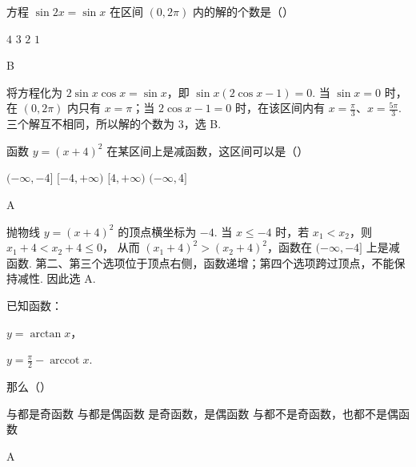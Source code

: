\documentclass[UTF8,a4paper,oneside,11pt]{ctexbook}
\begin{document}
\begin{problem}
方程 \(\sin 2x = \sin x\) 在区间 \((0,2\pi)\) 内的解的个数是（\quad）

\choices
    {\(4\)}
    {\(3\)}
    {\(2\)}
    {\(1\)}
\end{problem}

\begin{answer}
B
\end{answer}

\begin{solution}
将方程化为
\(2\sin x\cos x=\sin x\)，即 \(\sin x(2\cos x-1)=0\).
当 \(\sin x=0\) 时，在 \((0,2\pi)\) 内只有 \(x=\pi\)；当 \(2\cos x-1=0\) 时，在该区间内有 \(x=\frac{\pi}{3}\)、\(x=\frac{5\pi}{3}\). 三个解互不相同，所以解的个数为 \(3\)，选 B.
\end{solution}

\begin{problem}
函数 \(y=(x+4)^2\) 在某区间上是减函数，这区间可以是（\quad）

\choices
    {\((-\infty,-4]\)}
    {\([-4, +\infty)\)}
    {\([4, +\infty)\)}
    {\((-\infty,4]\)}
\end{problem}

\begin{answer}
A
\end{answer}

\begin{solution}
抛物线 \(y=(x+4)^2\) 的顶点横坐标为 \(-4\). 当 \(x\leqslant-4\) 时，若 \(x_1<x_2\)，则
\(x_1+4<x_2+4\leqslant0\)，
从而 \((x_1+4)^2>(x_2+4)^2\)，函数在 \((-\infty,-4]\) 上是减函数. 第二、第三个选项位于顶点右侧，函数递增；第四个选项跨过顶点，不能保持减性. 因此选 A.
\end{solution}

\begin{problem}
已知函数：
\begin{circlelist}
\item \(y=\arctan x\)，
\item \(y=\frac{\pi}{2}-\operatorname{arccot} x\).
\end{circlelist}
那么（\quad）

\choices
    {与都是奇函数}
    {与都是偶函数}
    {是奇函数，是偶函数}
    {与都不是奇函数，也都不是偶函数}
\end{problem}

\begin{answer}
A
\end{answer}
\end{document}
